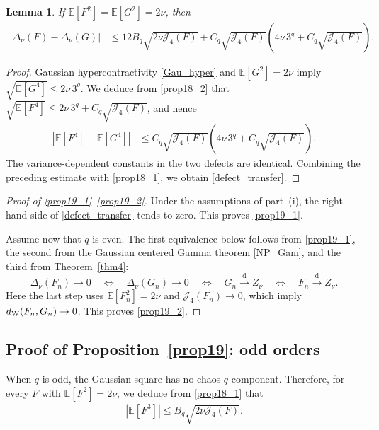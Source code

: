 \documentclass[letterpaper,11pt,reqno]{amsart}
\numberwithin{equation}{section}
\theoremstyle{plain}
\newtheorem{lemma}[theorem]{Lemma}
\theoremstyle{definition}
\theoremstyle{remark}
\newcommand{\E}{\mathbb{E}}
\newcommand{\noi}{\noindent}
\newcommand{\Jfour}{\mathcal J_4}
\newcommand{\dW}{d_{\rm W}}
\newcommand{\Del}{\Delta}
\begin{document}
\begin{lemma}
\label{lem_defect_transfer}
If $\E[F^2]=\E[G^2]=2\nu$, then
\noi
\begin{align}
 |\Del_\nu(F)-\Del_\nu(G)|
 &\leq12B_q\sqrt{2\nu\Jfour(F)}+
 C_q\sqrt{\Jfour(F)}
 \left(4\nu\,3^q+C_q\sqrt{\Jfour(F)}\right).
 \label{defect_transfer}
\end{align}
\end{lemma}

\begin{proof}
Gaussian hypercontractivity \eqref{Gau_hyper} and
$\E[G^2]=2\nu$ imply
$\sqrt{\E[G^4]}\leq2\nu\,3^q$.  We deduce from
\eqref{prop18_2} that
$\sqrt{\E[F^4]}\leq2\nu\,3^q+C_q\sqrt{\Jfour(F)}$, and hence
\begin{align*}
 |\E[F^4]-\E[G^4]|
 &\leq C_q\sqrt{\Jfour(F)}
 \left(4\nu\,3^q+C_q\sqrt{\Jfour(F)}\right).
\end{align*}
The variance-dependent constants in the two defects are identical.
Combining the preceding estimate with \eqref{prop18_1}, we obtain
\eqref{defect_transfer}.
\end{proof}

\begin{proof}[Proof of \eqref{prop19_1}--\eqref{prop19_2}]
Under the assumptions of part~{\rm(i)}, the right-hand side of
\eqref{defect_transfer} tends to zero.  This proves
\eqref{prop19_1}.

Assume now that $q$ is even.  The first equivalence below follows
from \eqref{prop19_1}, the second from the Gaussian centered Gamma
theorem \eqref{NP_Gam}, and the third from Theorem~\ref{thm4}:
\[
 \Del_\nu(F_n)\to0
 \quad\Longleftrightarrow\quad
 \Del_\nu(G_n)\to0
 \quad\Longleftrightarrow\quad
 G_n\xrightarrow{\mathrm d}Z_\nu
 \quad\Longleftrightarrow\quad
 F_n\xrightarrow{\mathrm d}Z_\nu.
\]
Here the last step uses $\E[F_n^2]=2\nu$ and
$\Jfour(F_n)\to0$, which imply $\dW(F_n,G_n)\to0$.  This proves
\eqref{prop19_2}.
\end{proof}


\subsection{Proof of Proposition~\ref{prop19}: odd orders}
\label{SEC_56}

When $q$ is odd, the Gaussian square has no chaos-$q$ component.
Therefore, for every $F$ with $\E[F^2]=2\nu$, we deduce from
\eqref{prop18_1} that
\noi
\begin{align}
 |\E[F^3]|
 \leq B_q\sqrt{2\nu\Jfour(F)}.
 \label{odd_third_bound}
\end{align}
\end{document}
